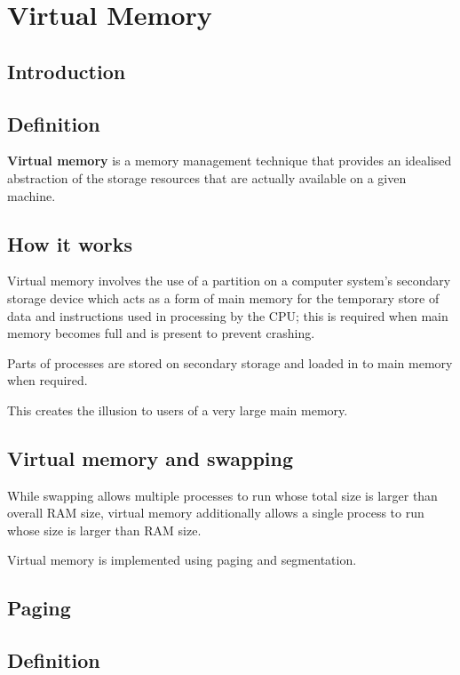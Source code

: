 \documentclass[a4paper]{systems-software}
\begin{document}
\chapter{Virtual Memory}

\section{Introduction}

\section*{Definition}

\textbf{Virtual memory} is a memory management technique that provides an idealised abstraction of the storage resources that are actually available on a given machine.


\section*{How it works}

Virtual memory involves the use of a partition on a computer system’s secondary storage device which acts as a form of main memory for the temporary store of data and instructions used in processing by the CPU; this is required when main memory becomes full and is present to prevent crashing.

Parts of processes are stored on secondary storage and loaded in to main memory when required.

This creates the illusion to users of a very large main memory.


\section*{Virtual memory and swapping}

While swapping allows multiple processes to run whose total size is larger than overall RAM size, virtual memory additionally allows a single process to run whose size is larger than RAM size.

Virtual memory is implemented using paging and segmentation.


\newpage

\section{Paging}

\section*{Definition}
\end{document}
